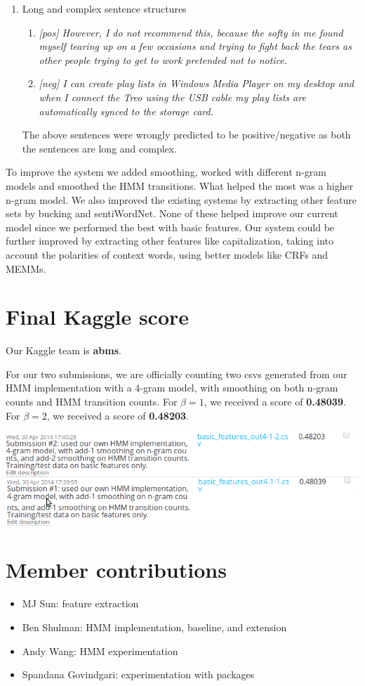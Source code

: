 \documentclass{article}
\begin{document}
\begin{enumerate}
\item Long and complex sentence structures
    \begin{enumerate}
    \item \textit{[pos] However, I do not recommend this, because the softy in me found myself tearing up on a few occasions and     trying to fight back the tears as other people trying to get to work pretended not to notice.      
    }
    \item \textit{[neg] I can create play lists in Windows Media Player on my desktop and when I connect the Treo using the USB     cable my play lists are automatically synced to the storage card.}
\end{enumerate}
The above sentences were wrongly predicted to be positive/negative as both the sentences are long and complex.
\end{enumerate} 
To improve the system we added smoothing, worked with different n-gram models and smoothed the HMM transitions. What helped the most was a higher n-gram model. We also improved the existing systems by extracting other feature sets by bucking and sentiWordNet. None of these helped improve our current model since we performed the best with basic features. Our system could be further improved by extracting other features like capitalization, taking into account the polarities of context words, using better models like CRFs and MEMMs.
\section{Final Kaggle score}
Our Kaggle team is \textbf{abms}.\par
For our two submissions, we are officially counting two csvs generated from our HMM implementation with a 4-gram model, with smoothing on both n-gram counts and HMM transition counts. For $\beta = 1$, we received a score of \textbf{0.48039}. For $\beta = 2$, we received a score of \textbf{0.48203}.\par\medskip

\noindent
\includegraphics[width=\textwidth]{kagglesubs.png}\par\bigskip

\section{Member contributions}
\begin{itemize}[noitemsep]
  \item MJ Sun: feature extraction
  \item Ben Shulman: HMM implementation, baseline, and extension
  \item Andy Wang: HMM experimentation
  \item Spandana Govindgari: experimentation with packages
\end{itemize}
\end{document}
